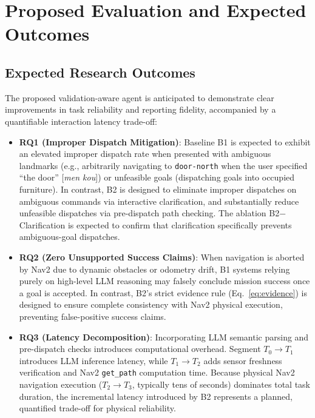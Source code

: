 \documentclass[conference]{IEEEtran}
\begin{document}
\section{Proposed Evaluation and Expected Outcomes}

\subsection{Expected Research Outcomes}
The proposed validation-aware agent is anticipated to demonstrate clear improvements in task reliability and reporting fidelity, accompanied by a quantifiable interaction latency trade-off:
\begin{itemize}
    \setlength{\itemsep}{1.5pt}
    \setlength{\parskip}{0pt}
    \setlength{\parsep}{0pt}
    \item \textbf{RQ1 (Improper Dispatch Mitigation)}: Baseline B1 is expected to exhibit an elevated improper dispatch rate when presented with ambiguous landmarks (e.g., arbitrarily navigating to \texttt{door-north} when the user specified ``the door'' [\textit{men kou}]) or unfeasible goals (dispatching goals into occupied furniture). In contrast, B2 is designed to eliminate improper dispatches on ambiguous commands via interactive clarification, and substantially reduce unfeasible dispatches via pre-dispatch path checking. The ablation B2$-$Clarification is expected to confirm that clarification specifically prevents ambiguous-goal dispatches.
    \item \textbf{RQ2 (Zero Unsupported Success Claims)}: When navigation is aborted by Nav2 due to dynamic obstacles or odometry drift, B1 systems relying purely on high-level LLM reasoning may falsely conclude mission success once a goal is accepted. In contrast, B2's strict evidence rule (Eq.~\ref{eq:evidence}) is designed to ensure complete consistency with Nav2 physical execution, preventing false-positive success claims.
    \item \textbf{RQ3 (Latency Decomposition)}: Incorporating LLM semantic parsing and pre-dispatch checks introduces computational overhead. Segment $T_0 \to T_1$ introduces LLM inference latency, while $T_1 \to T_2$ adds sensor freshness verification and Nav2 \texttt{get\_path} computation time. Because physical Nav2 navigation execution ($T_2 \to T_3$, typically tens of seconds) dominates total task duration, the incremental latency introduced by B2 represents a planned, quantified trade-off for physical reliability.
\end{itemize}
\end{document}

